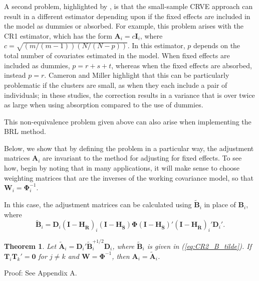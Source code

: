 \documentclass[12pt]{article}\usepackage[]{graphicx}\usepackage[]{color}
\newtheorem{thm}{Theorem}
\newcommand{\bm}{\mathbf}
\newcommand{\bs}{\boldsymbol}
\begin{document}
A second problem, highlighted by \citet{Cameron2015practitioners}, is that the small-sample CRVE approach can result in a different estimator depending upon if the fixed effects are included in the model as dummies or absorbed. 
For example, this problem arises with the CR1 estimator, which has the form $\bm{A}_i = c\bm{I}_i$, where $c = \sqrt{(m/(m-1))(N/(N - p))}$. In this estimator, $p$ depends on the total number of covariates estimated in the model.
When fixed effects are included as dummies, $p = r + s + t$, whereas when the fixed effects are absorbed, instead $p = r$. 
Cameron and Miller highlight that this can be particularly problematic if the clusters are small, as when they each include a pair of individuals; in these studies, the correction results in a variance that is over twice as large when using absorption compared to the use of dummies.

This non-equivalence problem given above can also arise when implementing the BRL method.

Below, we show that by defining the problem in a particular way, the adjustment matrices $\bm{A}_i$ are invariant to the method for adjusting for fixed effects.
To see how, begin by noting that in many applications, it will make sense to choose weighting matrices that are the inverses of the working covariance model, so that $\bm{W}_i = \bs\Phi_i^{-1}$. 


In this case, the adjustment matrices can be calculated using $\bm{\tilde{B}}_i$ in place of $\bm{B}_i$, where
\begin{equation}
\label{eq:CR2_B_tilde}
\bm{\tilde{B}}_i = \bm{D}_i\left(\bm{I} - \bm{H_{\ddot{R}}}\right)_i \left(\bm{I} - \bm{H_{\ddot{S}}}\right) \bs\Phi \left(\bm{I} - \bm{H_{\ddot{S}}}\right)' \left(\bm{I} - \bm{H_{\ddot{R}}}\right)_i' \bm{D}_i'.
\end{equation}

\begin{thm}
\label{thm:absorb}
Let $\bm{\tilde{A}}_i = \bm{D}_i'\bm{\tilde{B}}_i^{+1/2} \bm{D}_i$, where $\bm{\tilde{B}}_i$ is given in (\ref{eq:CR2_B_tilde}). If $\bm{T}_i \bm{T}_k' = \bm{0}$ for $j \neq k$ and $\bm{W} = \bs\Phi^{-1}$, then $\bm{A}_i = \bm{\tilde{A}}_i$. 
\end{thm}
Proof: See Appendix A.
\end{document}

